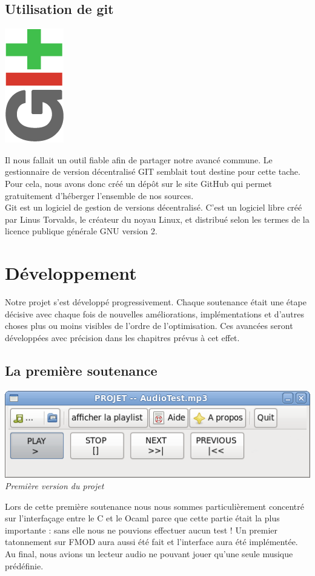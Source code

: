 \documentclass[12pt,a4paper]{report}
\begin{document}
\section{Utilisation de git}

\begin{center}
\includegraphics[scale =0.5]{git.png}
\end{center}

Il nous fallait un outil fiable afin de partager notre avancé commune. Le gestionnaire de version décentralisé GIT semblait tout destine pour cette tache. Pour cela, nous avons donc créé un dépôt sur le site GitHub qui permet gratuitement d'héberger l'ensemble de nos sources.\\
Git est un logiciel de gestion de versions décentralisé. C'est un logiciel libre créé par Linus Torvalds, le créateur du noyau Linux, et distribué selon les termes de la licence publique générale GNU version 2.


\chapter{Développement}
Notre projet s'est développé progressivement. Chaque soutenance était une étape décisive avec chaque fois de nouvelles améliorations, implémentations et d'autres choses plus ou moins visibles de l'ordre de l'optimisation.
Ces avancées seront développées avec précision dans les chapitres prévus à cet effet.

\section{La première soutenance}

\begin{center}
\includegraphics[scale = 0.8]{interface1.png}
\it{Première version du projet}

\end{center}
Lors de cette première soutenance nous nous sommes particulièrement concentré sur l'interfaçage entre le C et le Ocaml parce que cette partie était la plus importante : sans elle nous ne pouvions effectuer aucun test !
Un premier tatonnement sur FMOD aura aussi été fait et l'interface aura été implémentée. 
Au final, nous avions un lecteur audio ne pouvant jouer qu'une seule musique prédéfinie.
\end{document}
